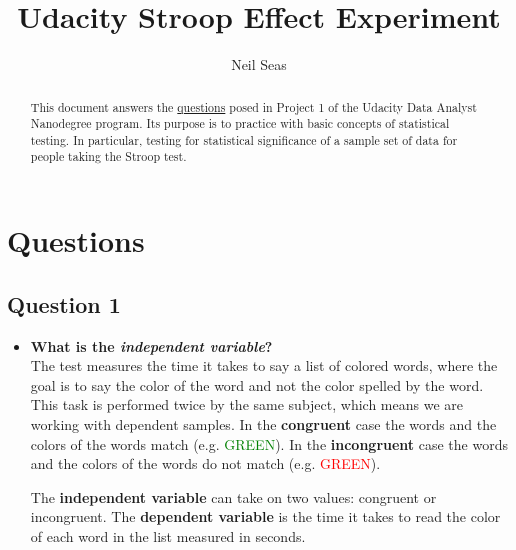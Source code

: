 \documentclass[a4paper,11pt]{report}
\title{Udacity Stroop Effect Experiment}
\author{Neil Seas}
\begin{document}
\maketitle
\tableofcontents

\begin{abstract}
This document answers the \href{https://docs.google.com/document/d/1-OkpZLjG_kX9J6LIQ5IltsqMzVWjh36QpnP2RYpVdPU/pub?embedded=True}{questions} posed in Project 1 of the Udacity Data Analyst Nanodegree program.  Its purpose is to practice with basic concepts of statistical testing.  In particular, testing for statistical significance of a sample set of data for people taking the Stroop test.
\end{abstract}

\chapter{Questions}
\section{Question 1}
  \begin{itemize}
    \item \textbf{What is the \textit{independent variable}?}\\
    The test measures the time it takes to say a list of colored words, where the goal is to say the color of the word and not the color spelled by the word.  This task is performed twice by the same subject, which means we are working with dependent samples.  In the \textbf{congruent} case the words and the colors of the words match (e.g. \textcolor{green}{GREEN}).  In the \textbf{incongruent} case the words and the colors of the words do not match (e.g. \textcolor{red}{GREEN}).

The \textbf{independent variable} can take on two values: congruent or incongruent.  The \textbf{dependent variable} is the time it takes to read the color of each word in the list measured in seconds.
  \end{itemize}
\end{document}
